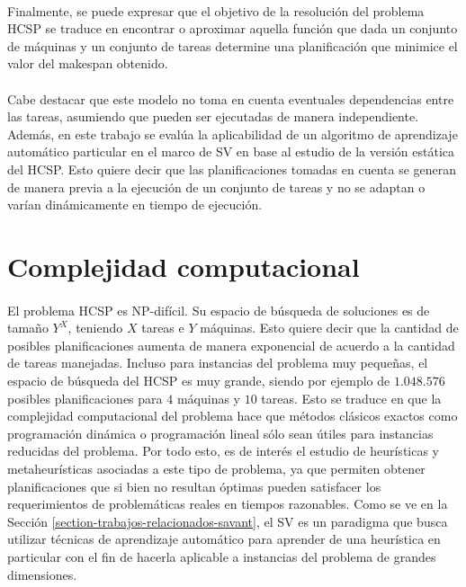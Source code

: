 \paragraph{}Finalmente, se puede expresar que el objetivo de la resolución del problema HCSP se traduce en encontrar o aproximar aquella función que dada un conjunto de máquinas y un conjunto de tareas determine una planificación que minimice el valor del makespan obtenido.

\paragraph{}Cabe destacar que este modelo no toma en cuenta eventuales dependencias entre las tareas, asumiendo que pueden ser ejecutadas de manera independiente.
Además, en este trabajo se evalúa la aplicabilidad de un algoritmo de aprendizaje automático particular en el marco de SV en base al estudio de la versión estática del HCSP.
Esto quiere decir que las planificaciones tomadas en cuenta se generan de manera previa a la ejecución de un conjunto de tareas y no se adaptan o varían dinámicamente en tiempo de ejecución.

\section{Complejidad computacional} \label{section:descripcion-problema,subsection:complejidad-computacional}

\paragraph{}El problema HCSP es NP-difícil.
Su espacio de búsqueda de soluciones es de tamaño $Y^X$, teniendo $X$ tareas e $Y$ máquinas.
Esto quiere decir que la cantidad de posibles planificaciones aumenta de manera exponencial de acuerdo a la cantidad de tareas manejadas.
Incluso para instancias del problema muy pequeñas, el espacio de búsqueda del HCSP es muy grande, siendo por ejemplo de $1.048.576$ posibles planificaciones para $4$ máquinas y $10$ tareas.
Esto se traduce en que la complejidad computacional del problema hace que métodos clásicos exactos como programación dinámica o programación lineal sólo sean útiles para instancias reducidas del problema.
Por todo esto, es de interés el estudio de heurísticas y metaheurísticas asociadas a este tipo de problema, ya que permiten obtener planificaciones que si bien no resultan óptimas pueden satisfacer los requerimientos de problemáticas reales en tiempos razonables.
Como se ve en la Sección \ref{section-trabajos-relacionados-savant}, el SV es un paradigma que busca utilizar técnicas de aprendizaje automático para aprender de una heurística en particular con el fin de hacerla aplicable a instancias del problema de grandes dimensiones.


